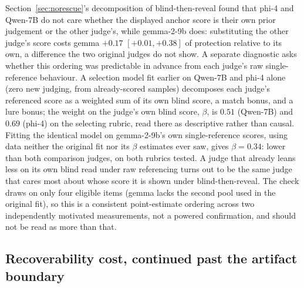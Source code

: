 \documentclass[11pt]{article}
\begin{document}
Section~\ref{sec:norescue}'s decomposition of blind-then-reveal found that phi-4 and Qwen-7B do not care whether the displayed anchor score is their own prior judgement or the other judge's, while gemma-2-9b does: substituting the other judge's score costs gemma $+0.17$ $[+0.01,+0.38]$ of protection relative to its own, a difference the two original judges do not show. A separate diagnostic asks whether this ordering was predictable in advance from each judge's raw single-reference behaviour. A selection model fit earlier on Qwen-7B and phi-4 alone (zero new judging, from already-scored samples) decomposes each judge's referenced score as a weighted sum of its own blind score, a match bonus, and a lure bonus; the weight on the judge's own blind score, $\beta$, is $0.51$ (Qwen-7B) and $0.69$ (phi-4) on the selecting rubric, read there as descriptive rather than causal. Fitting the identical model on gemma-2-9b's own single-reference scores, using data neither the original fit nor its $\beta$ estimates ever saw, gives $\beta = 0.34$: lower than both comparison judges, on both rubrics tested. A judge that already leans less on its own blind read under raw referencing turns out to be the same judge that cares most about whose score it is shown under blind-then-reveal. The check draws on only four eligible items (gemma lacks the second pool used in the original fit), so this is a consistent point-estimate ordering across two independently motivated measurements, not a powered confirmation, and should not be read as more than that.

\subsection{Recoverability cost, continued past the artifact boundary}
\label{sec:appendix-recoverability}
\end{document}
